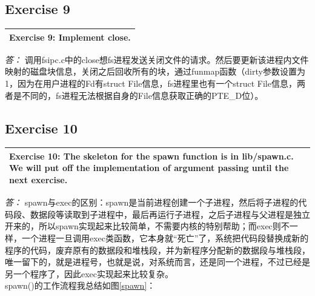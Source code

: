 \documentclass[11pt,a4paper]{article}
\newcommand{\exercise}[2]{
\begin{tabular}{|p{\textwidth}|}
\hline
#1: #2\\
\hline
\end{tabular}
\textit{\large{答：}}}
\begin{document}
\subsection{Exercise 9}
\exercise{Exercise 9}{Implement close.}
调用fsipc.c中的close想fs进程发送关闭文件的请求。然后要更新该进程内文件映射的磁盘块信息，关闭之后回收所有的块，通过funmap函数（dirty参数设置为1，因为在用户进程的Fd有struct File信息，fs进程里也有一个struct File信息，两者是不同的，fs进程无法根据自身的File信息获取正确的PTE\_D位）。

\subsection{Exercise 10}
\exercise{Exercise 10}{The skeleton for the spawn function is in lib/spawn.c. We will put off the implementation of argument passing until the next exercise.}
spawn与exec的区别：spawn是当前进程创建一个子进程，然后将子进程的代码段、数据段等读取到子进程中，最后再运行子进程，之后子进程与父进程是独立开来的，所以spawn实现起来比较简单，不需要内核的特别帮助；而exec则不一样，一个进程一旦调用exec类函数，它本身就“死亡”了，系统把代码段替换成新的程序的代码，废弃原有的数据段和堆栈段，并为新程序分配新的数据段与堆栈段，唯一留下的，就是进程号，也就是说，对系统而言，还是同一个进程，不过已经是另一个程序了，因此exec实现起来比较复杂。\\
spawn()的工作流程我总结如图\ref{spawn}：\\
\end{document}
